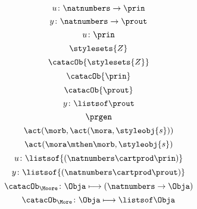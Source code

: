 {\begin{forslides}
        \begin{equation}
            \label{eq:prgen-u-1}
            u\colon \natnumbers \to \prin
        \end{equation}
        \begin{equation}
            \label{eq:prgen-y-1}
            y\colon \natnumbers \to \prout
        \end{equation}
        \begin{equation}
            \label{eq:prgen-u-2}
            u\colon \prin
        \end{equation}
        \begin{equation}
            \label{eq:Z}
            \stylesets{Z}
        \end{equation}
        \begin{equation}
            \label{eq:Za}
            \catacOb{\stylesets{Z}}
        \end{equation}
        \begin{equation}
            \label{eq:Ua}
            \catacOb{\prin}
        \end{equation}
        \begin{equation}
            \label{eq:Ya}
            \catacOb{\prout}
        \end{equation}
        \begin{equation}
            \label{eq:prgen-y-2}
            y\colon \listsof  \prout
        \end{equation}
        \begin{equation}
            \label{eq:prgen}
            \prgen
        \end{equation}
        \begin{equation}
            \label{eq:now1}
            \act(\morb, \act(\mora, \styleobj{s}))
        \end{equation}
        \begin{equation}
            \label{eq:now2}
            \act(\mora\mthen\morb, \styleobj{s})
        \end{equation}
        \begin{equation}
            \label{eq:ev-sign}
            u\colon \listsof{(\natnumbers \cartprod \prin)}
        \end{equation}
        \begin{equation}
            \label{eq:ev-sign2}
            y\colon \listsof{(\natnumbers \cartprod \prout)}
        \end{equation}
        \begin{equation}
            \label{eq:phi-moore}
            {\catacOb_{\Moore}}\colon{\Obja}\longmapsto{(\natnumbers \to \Obja)}
        \end{equation}
        \begin{equation}
            \label{eq:phi-more}
            {\catacOb_{\More}}\colon{\Obja}\longmapsto{\listsof \Obja}
        \end{equation}
    \end{forslides}
}
